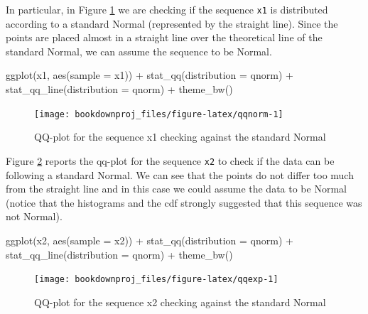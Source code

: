 \documentclass[
]{book}
\newenvironment{Shaded}{\begin{snugshade}}{\end{snugshade}}
\newcommand{\AttributeTok}[1]{\textcolor[rgb]{0.77,0.63,0.00}{#1}}
\newcommand{\FunctionTok}[1]{\textcolor[rgb]{0.00,0.00,0.00}{#1}}
\newcommand{\NormalTok}[1]{#1}
\newcommand{\SpecialCharTok}[1]{\textcolor[rgb]{0.00,0.00,0.00}{#1}}
\begin{document}
In particular, in Figure \ref{fig:qqnorm} we are checking if the sequence \texttt{x1} is distributed according to a standard Normal (represented by the straight line). Since the points are placed almost in a straight line over the theoretical line of the standard Normal, we can assume the sequence to be Normal.

\begin{Shaded}
\begin{Highlighting}[]
\FunctionTok{ggplot}\NormalTok{(x1, }\FunctionTok{aes}\NormalTok{(}\AttributeTok{sample =}\NormalTok{ x1)) }\SpecialCharTok{+}
   \FunctionTok{stat\_qq}\NormalTok{(}\AttributeTok{distribution =}\NormalTok{ qnorm) }\SpecialCharTok{+}
   \FunctionTok{stat\_qq\_line}\NormalTok{(}\AttributeTok{distribution =}\NormalTok{ qnorm) }\SpecialCharTok{+}
   \FunctionTok{theme\_bw}\NormalTok{()}
\end{Highlighting}
\end{Shaded}

\begin{figure}

{\centering \texttt{[image: bookdownproj\_files/figure-latex/qqnorm-1]} 

}

\caption{QQ-plot for the sequence x1 checking against the standard Normal}\label{fig:qqnorm}
\end{figure}

Figure \ref{fig:qqexp} reports the qq-plot for the sequence \texttt{x2} to check if the data can be following a standard Normal. We can see that the points do not differ too much from the straight line and in this case we could assume the data to be Normal (notice that the histograms and the cdf strongly suggested that this sequence was not Normal).

\begin{Shaded}
\begin{Highlighting}[]
\FunctionTok{ggplot}\NormalTok{(x2, }\FunctionTok{aes}\NormalTok{(}\AttributeTok{sample =}\NormalTok{ x2)) }\SpecialCharTok{+}
   \FunctionTok{stat\_qq}\NormalTok{(}\AttributeTok{distribution =}\NormalTok{ qnorm) }\SpecialCharTok{+}
   \FunctionTok{stat\_qq\_line}\NormalTok{(}\AttributeTok{distribution =}\NormalTok{ qnorm) }\SpecialCharTok{+}
   \FunctionTok{theme\_bw}\NormalTok{()}
\end{Highlighting}
\end{Shaded}

\begin{figure}

{\centering \texttt{[image: bookdownproj\_files/figure-latex/qqexp-1]} 

}

\caption{QQ-plot for the sequence x2 checking against the standard Normal}\label{fig:qqexp}
\end{figure}
\end{document}
